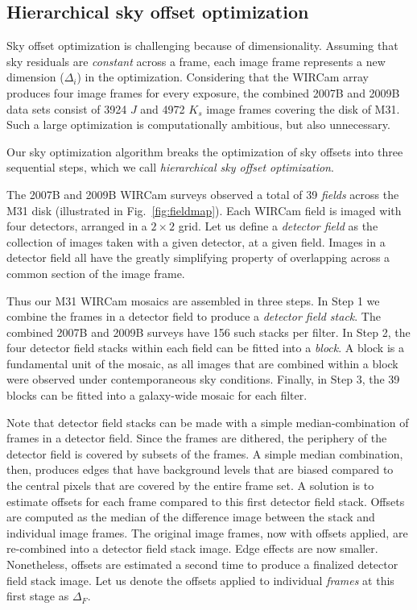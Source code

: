 \documentclass[iop]{emulateapj}
\newcommand{\Fig}[1]{Fig.~\ref{fig:#1}}  %
\begin{document}
\subsection{Hierarchical sky offset optimization}
\label{sec:hierarchical_algo}

Sky offset optimization is challenging because of dimensionality. Assuming that sky residuals are \emph{constant} across a frame, each image frame represents a new dimension ($\Delta_i$) in the optimization. Considering that the WIRCam array produces four image frames for every exposure, the combined 2007B and 2009B data sets consist of 3924 $J$ and 4972 $K_s$ image frames covering the disk of M31. Such a large optimization is computationally ambitious, but also unnecessary.

Our sky optimization algorithm breaks the optimization of sky offsets into three sequential steps, which we call \emph{hierarchical sky offset optimization}.

The 2007B and 2009B WIRCam surveys observed a total of 39 \emph{fields} across the M31 disk (illustrated in \Fig{fieldmap}).
Each WIRCam field is imaged with four detectors, arranged in a $2\times 2$ grid.
Let us define a \emph{detector field} as the collection of images taken with a given detector, at a given field.
Images in a detector field all have the greatly simplifying property of overlapping across a common section of the image frame.

Thus our M31 WIRCam mosaics are assembled in three steps.
In Step 1 we combine the frames in a detector field to produce a \emph{detector field stack}.
The combined 2007B and 2009B surveys have 156 such stacks per filter.
In Step 2, the four detector field stacks within each field can be fitted into a \emph{block}.
A block is a fundamental unit of the mosaic, as all images that are combined within a block were observed under contemporaneous sky conditions.
Finally, in Step 3, the 39 blocks can be fitted into a galaxy-wide mosaic for each filter.

Note that detector field stacks can be made with a simple median-combination of frames in a detector field.
Since the frames are dithered, the periphery of the detector field is covered by subsets of the frames.
A simple median combination, then, produces edges that have background levels that are biased compared to the central pixels that are covered by the entire frame set.
A solution is to estimate offsets for each frame compared to this first detector field stack.
Offsets are computed as the median of the difference image between the stack and individual image frames.
The original image frames, now with offsets applied, are re-combined into a detector field stack image.
Edge effects are now smaller.
Nonetheless, offsets are estimated a second time to produce a finalized detector field stack image.
Let us denote the offsets applied to individual \emph{frames} at this first stage as $\Delta_F$.
\end{document}
